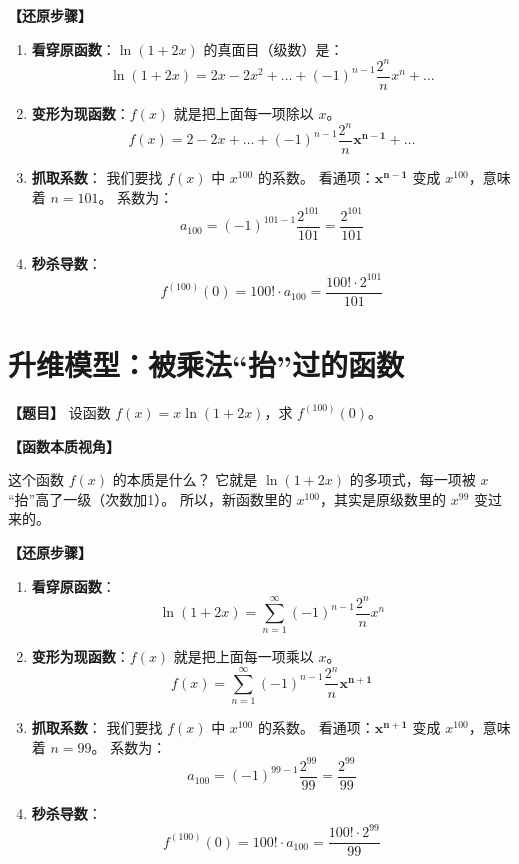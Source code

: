 \documentclass[UTF8, a4paper, 12pt]{article}
\newenvironment{essence}{
    \par\vspace{0.5em}\noindent
    \textbf{\color{purple}【函数本质视角】}
    \itshape
}{
    \par\vspace{0.5em}
}
\begin{document}
\textbf{【还原步骤】}
\begin{enumerate}
    \item \textbf{看穿原函数}：$\ln(1+2x)$ 的真面目（级数）是：
    \[ \ln(1+2x) = 2x - 2x^2 + \dots + (-1)^{n-1}\dfrac{2^n}{n}x^n + \dots \]
    
    \item \textbf{变形为现函数}：$f(x)$ 就是把上面每一项除以 $x$。
    \[ f(x) = 2 - 2x + \dots + (-1)^{n-1}\dfrac{2^n}{n}\mathbf{x^{n-1}} + \dots \]
    
    \item \textbf{抓取系数}：
    我们要找 $f(x)$ 中 $x^{100}$ 的系数。
    看通项：$\mathbf{x^{n-1}}$ 变成 $x^{100}$，意味着 $n=101$。
    系数为：
    \[ a_{100} = (-1)^{101-1}\dfrac{2^{101}}{101} = \dfrac{2^{101}}{101} \]
    
    \item \textbf{秒杀导数}：
    \[ f^{(100)}(0) = 100! \cdot a_{100} = \dfrac{100! \cdot 2^{101}}{101} \]
\end{enumerate}

\newpage

\section{升维模型：被乘法“抬”过的函数}

\textbf{【题目】}
设函数 $f(x) = x \ln(1+2x)$，求 $f^{(100)}(0)$。

\begin{essence}
这个函数 $f(x)$ 的本质是什么？
它就是 $\ln(1+2x)$ 的多项式，每一项被 $x$ “抬”高了一级（次数加1）。
所以，新函数里的 $x^{100}$，其实是原级数里的 $x^{99}$ 变过来的。
\end{essence}

\textbf{【还原步骤】}
\begin{enumerate}
    \item \textbf{看穿原函数}：
    \[ \ln(1+2x) = \sum_{n=1}^{\infty} (-1)^{n-1} \dfrac{2^n}{n} x^n \]
    
    \item \textbf{变形为现函数}：$f(x)$ 就是把上面每一项乘以 $x$。
    \[ f(x) = \sum_{n=1}^{\infty} (-1)^{n-1} \dfrac{2^n}{n} \mathbf{x^{n+1}} \]
    
    \item \textbf{抓取系数}：
    我们要找 $f(x)$ 中 $x^{100}$ 的系数。
    看通项：$\mathbf{x^{n+1}}$ 变成 $x^{100}$，意味着 $n=99$。
    系数为：
    \[ a_{100} = (-1)^{99-1}\dfrac{2^{99}}{99} = \dfrac{2^{99}}{99} \]
    
    \item \textbf{秒杀导数}：
    \[ f^{(100)}(0) = 100! \cdot a_{100} = \dfrac{100! \cdot 2^{99}}{99} \]
\end{enumerate}
\end{document}

